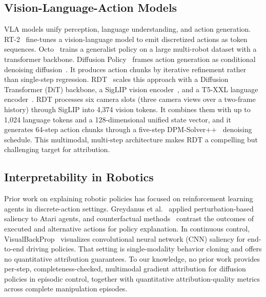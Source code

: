 \documentclass{article}
\begin{document}
\subsection{Vision-Language-Action Models}

VLA models unify perception, language understanding, and action generation.
RT-2~\cite{zitkovich2023rt2} fine-tunes a vision-language model to emit discretized actions as token sequences.
Octo~\cite{team2024octo} trains a generalist policy on a large multi-robot dataset with a transformer backbone.
Diffusion Policy~\cite{chi2023diffusion} frames action generation as conditional denoising diffusion~\cite{ho2020ddpm}.
It produces action chunks by iterative refinement rather than single-step regression.
RDT~\cite{liu2024rdt} scales this approach with a Diffusion Transformer (DiT) backbone, a SigLIP vision encoder~\cite{zhai2023siglip}, and a T5-XXL language encoder~\cite{raffel2020t5}.
RDT processes six camera slots (three camera views over a two-frame history) through SigLIP into 4{,}374 vision tokens.
It combines them with up to 1{,}024 language tokens and a 128-dimensional unified state vector, and it generates 64-step action chunks through a five-step DPM-Solver++~\cite{lu2022dpm} denoising schedule.
This multimodal, multi-step architecture makes RDT a compelling but challenging target for attribution.

\subsection{Interpretability in Robotics}

Prior work on explaining robotic policies has focused on reinforcement learning agents in discrete-action settings.
Greydanus et al.~ applied perturbation-based saliency to Atari agents, and counterfactual methods~\cite{amitai2024explaining} contrast the outcomes of executed and alternative actions for policy explanation.
In continuous control, VisualBackProp~\cite{bojarski2018visualbackprop} visualizes convolutional neural network (CNN) saliency for end-to-end driving policies.
That setting is single-modality behavior cloning and offers no quantitative attribution guarantees.
To our knowledge, no prior work provides per-step, completeness-checked, multimodal gradient attribution for diffusion policies in episodic control, together with quantitative attribution-quality metrics across complete manipulation episodes.

\end{document}
